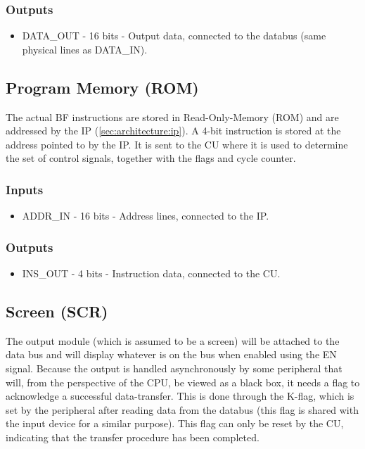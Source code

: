 \subsubsection*{Outputs}
\begin{itemize}
\itemsep0em 
\item DATA\_OUT - 16 bits - Output data, connected to the databus (same physical lines as DATA\_IN).
\end{itemize}

\subsection{Program Memory (ROM)} \label{sec:architecture:rom}
The actual BF instructions are stored in Read-Only-Memory (ROM) and are addressed by the IP (\ref{sec:architecture:ip}). A 4-bit instruction is stored at the address pointed to by the IP. It is sent to the CU where it is used to determine the set of control signals, together with the flags and cycle counter.

\subsubsection*{Inputs}
\begin{itemize}
\itemsep0em 
\item ADDR\_IN - 16 bits - Address lines, connected to the IP.
\end{itemize}

\subsubsection*{Outputs}
\begin{itemize}
\itemsep0em 
\item INS\_OUT - 4 bits - Instruction data, connected to the CU.
\end{itemize}


\subsection{Screen (SCR)}  \label{sec:architecture:scr}
The output module (which is assumed to be a screen) will be attached to the data bus and will display whatever is on the bus  when enabled using the EN signal. Because the output is handled asynchronously by some peripheral that will, from the perspective of the CPU, be viewed as a black box, it needs a flag to acknowledge a successful data-transfer. This is done through the K-flag, which is set by the peripheral after reading data from the databus (this flag is shared with the input device for a similar purpose). This flag can only be reset by the CU, indicating that the transfer procedure has been completed.
